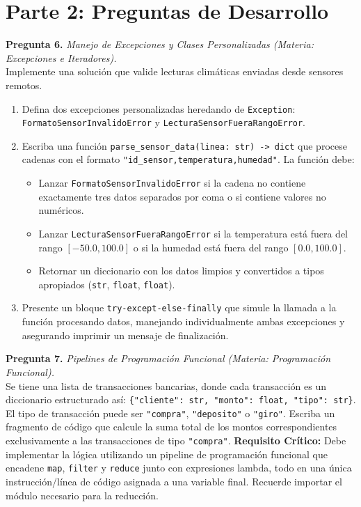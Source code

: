\documentclass[12pt,letterpaper]{article}
\begin{document}
\pagebreak

\section*{Parte 2: Preguntas de Desarrollo}

\textbf{Pregunta 6.} \textit{Manejo de Excepciones y Clases Personalizadas (Materia: Excepciones e Iteradores).} \\
Implemente una solución que valide lecturas climáticas enviadas desde sensores remotos.
\begin{enumerate}[label=\alph*)]
  \item Defina dos excepciones personalizadas heredando de \texttt{Exception}: \texttt{FormatoSensorInvalidoError} y \texttt{LecturaSensorFueraRangoError}.
  \item Escriba una función \texttt{parse\_sensor\_data(linea: str) -> dict} que procese cadenas con el formato \texttt{"id\_sensor,temperatura,humedad"}. La función debe:
    \begin{itemize}
      \item Lanzar \texttt{FormatoSensorInvalidoError} si la cadena no contiene exactamente tres datos separados por coma o si contiene valores no numéricos.
      \item Lanzar \texttt{LecturaSensorFueraRangoError} si la temperatura está fuera del rango $[-50.0, 100.0]$ o si la humedad está fuera del rango $[0.0, 100.0]$.
      \item Retornar un diccionario con los datos limpios y convertidos a tipos apropiados (\texttt{str}, \texttt{float}, \texttt{float}).
    \end{itemize}
  \item Presente un bloque \texttt{try-except-else-finally} que simule la llamada a la función procesando datos, manejando individualmente ambas excepciones y asegurando imprimir un mensaje de finalización.
\end{enumerate}

\bigskip

\textbf{Pregunta 7.} \textit{Pipelines de Programación Funcional (Materia: Programación Funcional).} \\
Se tiene una lista de transacciones bancarias, donde cada transacción es un diccionario estructurado así: \texttt{\{"cliente": str, "monto": float, "tipo": str\}}. El tipo de transacción puede ser \texttt{"compra"}, \texttt{"deposito"} o \texttt{"giro"}.
Escriba un fragmento de código que calcule la suma total de los montos correspondientes exclusivamente a las transacciones de tipo \texttt{"compra"}.
\textbf{Requisito Crítico:} Debe implementar la lógica utilizando un pipeline de programación funcional que encadene \texttt{map}, \texttt{filter} y \texttt{reduce} junto con expresiones lambda, todo en una única instrucción/línea de código asignada a una variable final. Recuerde importar el módulo necesario para la reducción.
\end{document}
